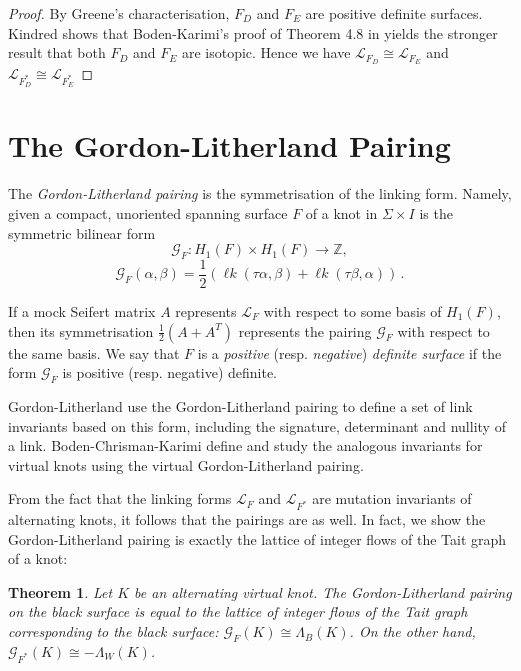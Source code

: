 \documentclass[12pt]{report}
\newcommand{\Z}{\mathbb{Z}}
\newcommand{\lk}{\operatorname{\ell\textit{k}}}
\newtheorem*{theorem}{Theorem}
\theoremstyle{upright}
\begin{document}
\begin{proof}
By Greene's characterisation, $F_{D}$ and $F_{E}$ are positive definite surfaces. Kindred \cite[Theorem 2.8]{virtual-flyping-theorem} shows that Boden-Karimi's proof of Theorem 4.8 in \cite{alternating-links-thickened-surfaces} yields the stronger result that both $F_{D}$ and $F_{E}$ are isotopic. Hence we have $\mathcal{L}_{F_{D}} \cong \mathcal{L}_{F_{E}}$ and $\mathcal{L}_{F^{*}_{D}} \cong \mathcal{L}_{F^{*}_{E}}$
\end{proof}

\section{The Gordon-Litherland Pairing}

The \textit{Gordon-Litherland pairing} is the symmetrisation of the linking form. Namely, given a compact, unoriented spanning surface $F$ of a knot in $\Sigma \times I$ is the symmetric bilinear form
\[\mathcal{G}_{F}: H_{1}(F) \times H_{1}(F) \longrightarrow \Z,\]
\[\mathcal{G}_{F}(\alpha, \beta) = \dfrac{1}{2}(\lk(\tau \alpha, \beta) + \lk(\tau\beta, \alpha))\,.\]

If a mock Seifert matrix $A$ represents $\mathcal{L}_{F}$ with respect to some basis of $H_{1}(F)$, then its symmetrisation $\frac{1}{2}(A + A^{T})$ represents the pairing $\mathcal{G}_{F}$ with respect to the same basis. We say that $F$ is a \textit{positive} (resp. \textit{negative}) \textit{definite surface} if the form $\mathcal{G}_{F}$ is positive (resp. negative) definite.

Gordon-Litherland \cite{signature-of-a-link} use the Gordon-Litherland pairing to define a set of link invariants based on this form, including the signature, determinant and nullity of a link. Boden-Chrisman-Karimi \cite{gordon-litherland-pairing-thickened-surfaces} define and study the analogous invariants for virtual knots using the virtual Gordon-Litherland pairing.

From the fact that the linking forms $\mathcal{L}_{F}$ and $\mathcal{L}_{F^{*}}$ are mutation invariants of alternating knots, it follows that the pairings are as well. In fact, we show the Gordon-Litherland pairing is exactly the lattice of integer flows of the Tait graph of a knot:

\begin{theorem}
Let $K$ be an alternating virtual knot. The Gordon-Litherland pairing on the black surface  is equal to the lattice of integer flows of the Tait graph corresponding to the black surface: $\mathcal{G}_{F}(K) \cong \Lambda_{B}(K)$. On the other hand, $\mathcal{G}_{F^{*}}(K) \cong -\Lambda_{W}(K)$.
\end{theorem}
\end{document}
